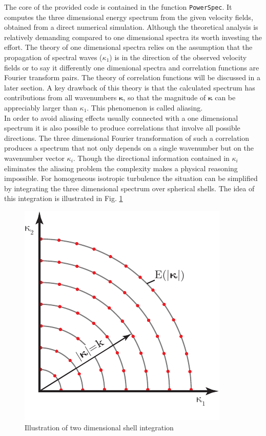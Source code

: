 \documentclass[ntfdMod]{elsarticle}
\begin{document}
\begin{par}

The core of the provided code is contained in the function
\lstinline!PowerSpec!. It computes the three dimensional energy spectrum
from the given velocity fields, obtained from a direct numerical
simulation. Although the theoretical analysis is
relatively demanding compared to one dimensional spectra its worth
investing the effort. The theory of one dimensional spectra relies
on the assumption that the propagation of spectral waves ($\kappa_1$)
is in the
direction of the observed velocity fields or to say it differently one
dimenional spectra and correlation functions are Fourier transform pairs.
The theory of correlation functions will be discussed in a later section.
A key drawback of this theory is that the calculated spectrum has
contributions from all wavenumbers $\boldsymbol\kappa$, so that the
magnitude of $\boldsymbol\kappa$ can be appreciably larger than
$\kappa_1$. This phenomenon is called aliasing.\\
In order to avoid aliasing effects usually connected with a one
dimensional spectrum it is also possible to produce correlations that
involve all possible directions. The three dimensional Fourier
transformation of such a correlation produces a spectrum that not only
depends on a single wavenumber but on the wavenumber vector $\kappa_i$.
Though the directional information contained in $\kappa_i$ eliminates the
aliasing problem the complexity makes a physical reasoning impossible.
For homogeneous isotropic turbulence the situation can be simplified by
integrating the three dimensional spectrum over spherical shells. The
idea of this integration is illustrated in Fig. \ref{fig:shell_int}
\begin{figure}
  \centering
  \includegraphics[scale=1]{shell_integration}
  \caption{Illustration of two dimensional shell integration}
  \label{fig:shell_int}
\end{figure}

\end{par} \vspace{1em}
\end{document}
